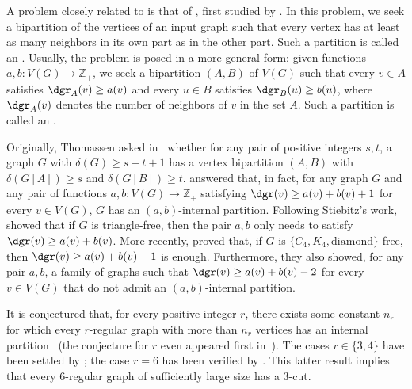 A problem  closely related to  is that of , first studied by \cite{internal_partition_thomassen}.
In this problem, we seek a bipartition of the vertices of an input graph such that every vertex has at least as many neighbors in its
own part as in the other part. Such a partition is called an .
Usually, the problem is posed in a more general form: given functions $a,b: V(G) \rightarrow \mathbb{Z}_+$, we seek a bipartition $(A,B)$ of $V(G)$ such that every $v \in A$ satisfies $\dgr_A(v) \geq a(v)$ and every $u \in B$ satisfies $\dgr_B(u) \geq b(u)$, where $\dgr_A(v)$ denotes the number of neighbors of $v$ in the set $A$. Such a partition is called an .

Originally, Thomassen asked in~\citep{internal_partition_thomassen} whether for any pair of positive integers $s,t$, a graph $G$ with $\delta(G) \geq s + t + 1$ has a vertex bipartition $(A,B)$ with $\delta(G[A]) \geq s$ and $\delta(G[B]) \geq t$.
\cite{internal_partition_stiebitz} answered that, in fact, for any graph $G$ and any pair of functions $a,b: V(G) \rightarrow \mathbb{Z}_+$ satisfying $\dgr(v) \geq a(v) + b(v) + 1$ for every $v \in V(G)$, $G$ has an $(a,b)$-internal partition.
Following Stiebitz's work, \cite{internal_partition_triangle_free} showed that if $G$ is triangle-free, then the pair $a,b$ only needs to satisfy $\dgr(v) \geq a(v) + b(v)$.
More recently, \cite{internal_partition_c4_free} proved that, if $G$ is $\{C_4, K_4, \text{diamond}\}$-free, then $\dgr(v) \geq a(v) + b(v) - 1$ is enough.
Furthermore, they also showed, for any pair $a,b$, a family of graphs such that $\dgr(v) \geq a(v) + b(v) - 2$ for every $v \in V(G)$ that do not admit an $(a,b)$-internal partition.

It is conjectured that, for every positive integer $r$, there exists some constant $n_r$ for which every $r$-regular graph with more than $n_r$ vertices has an internal partition~\citep{DeVos09,internal_partition_regular6} (the conjecture for $r$ even appeared first in~\citep{internal_partition_regular3_4}).
The cases $r \in \{3,4\}$ have been settled by \cite{internal_partition_regular3_4}; the case $r=6$ has been verified by \cite{internal_partition_regular6}.
This latter result implies that every 6-regular graph of sufficiently large size has a 3-cut.